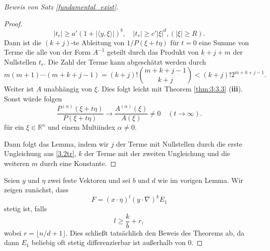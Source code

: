 \begin{proof}[Beweis von Satz \ref{fundamental_exist}]
\begin{proof}
\begin{equation}\label{3.2tr}
|t_r| \ge a' (1+|\langle y, \xi\rangle|)^b,\quad |t_r|\ge c' |\xi|^d, (|\xi|\ge R).
\end{equation}
Dann ist die $(k+j)$-te  Ableitung von $1/P(\xi+t\eta)$ für $t=0$ eine Summe von Terme die alle von der Form $A^{-1}$ geteilt durch das Produkt von $k+j+m$ der Nullstellen $t_r$. Die Zahl der Terme kann abgeschätzt werden durch
\begin{equation}
m(m+1) \cdots (m+k+j-1) =(k+j)! \binom{m+k+j-1}{k+j}<(k+j)! 2^{m+k+j-1}.
\end{equation}
Weiter ist $A$ unabhängig von $\xi$. Dies folgt leicht mit Theorem \ref{thm:3:3.3} ({\bf iii}). Sonst würde folgen 
\begin{equation}
\frac{P^{(\alpha)}(\xi + t\eta)}{P(\xi + t\eta)}\to \frac{A^{(\alpha)}(\xi)}{A(\xi)}\neq 0\quad(t\to \infty).
\end{equation}
für ein $\xi\in \mathbb R^n$ und einem Multiindex $\alpha\neq 0$.

Dann folgt das Lemma, indem wir $j$ der Terme mit Nullstellen durch die erste Ungleichung aus \eqref{3.2tr}, $k$ der Terme mit der zweiten Ungleichung und die weiteren $m$ durch eine Konstante.  
\end{proof}
Seien $y$ und $\eta$ zwei feste Vektoren und sei $b$ und $d$ wie im vorigen Lemma.  Wir zeigen zunächst, dass
\begin{equation}
F= (x\cdot \eta)^l (y \cdot \nabla)^k E_1
\end{equation}
stetig ist, falls
\begin{equation}\label{3.2l}
l\ge \frac{k}{b}+r, %
\end{equation}
wobei $r=\lfloor n/d +1\rfloor$.  Dies schließt tatsächlich den Beweis des Theorems ab, da dann $E_1$ beliebig oft stetig differenzierbar ist außerhalb von $0$.  %


\end{proof}

